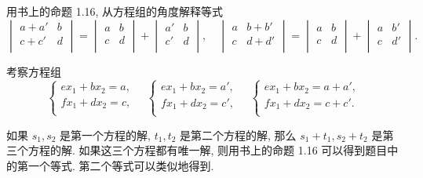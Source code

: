 \documentclass{ctexart}
\begin{document}
\begin{exercisec}[1.18(3)]
    用书上的命题 1.16, 从方程组的角度解释等式
    \[\begin{vmatrix}
        a+a' & b \\
        c+c' & d \\
    \end{vmatrix}=\begin{vmatrix}
        a & b \\
        c & d \\
    \end{vmatrix}+\begin{vmatrix}
        a' & b \\
        c' & d \\
    \end{vmatrix},\quad\begin{vmatrix}
        a & b+b' \\
        c & d+d' \\
    \end{vmatrix}=\begin{vmatrix}
        a & b \\
        c & d \\
    \end{vmatrix}+\begin{vmatrix}
        a & b' \\
        c & d' \\
    \end{vmatrix}.\]
\end{exercisec}
\begin{solution}
    考察方程组
    \[\begin{cases}
        ex_1+bx_2=a, \\
        fx_1+dx_2=c, \\
    \end{cases}\quad\begin{cases}
        ex_1+bx_2=a', \\
        fx_1+dx_2=c', \\
    \end{cases}\quad\begin{cases}
        ex_1+bx_2=a+a', \\
        fx_1+dx_2=c+c'. \\
    \end{cases}\]

    如果 $s_1,s_2$ 是第一个方程的解, $t_1,t_2$ 是第二个方程的解, 那么 $s_1+t_1,s_2+t_2$ 是第三个方程的解. 如果这三个方程都有唯一解, 则用书上的命题 1.16 可以得到题目中的第一个等式. 第二个等式可以类似地得到.
\end{solution}
\end{document}
